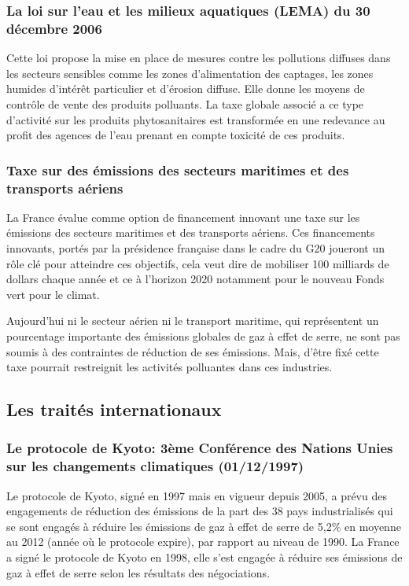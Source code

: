\documentclass[a4paper,11pt]{article}
\begin{document}
\subsubsection[La loi sur l’eau et les milieux aquatiques (LEMA)]{La loi sur l’eau et les milieux aquatiques (LEMA) du 30 décembre 2006}

Cette loi propose la mise en place de mesures contre les pollutions diffuses dans les secteurs sensibles comme les zones d’alimentation des captages, les zones humides d’intérêt particulier et d’érosion diffuse.
Elle donne les moyens de contrôle de vente des produits polluants. La taxe globale associé a ce type d’activité sur les produits phytosanitaires est transformée en une redevance au profit des agences de l’eau prenant en compte toxicité de ces produits.

\subsubsection{Taxe sur des émissions des secteurs maritimes et des transports aériens}

La France évalue comme option de financement innovant une taxe sur les émissions
des secteurs  maritimes et des  transports aériens. Ces  financements innovants,
portés par  la présidence française  dans le cadre  du G20 joueront un  rôle clé
pour  atteindre ces  objectifs, cela  veut dire  de mobiliser  100  milliards de
dollars chaque année et ce à l’horizon 2020 notamment pour le nouveau Fonds vert
pour le climat.


Aujourd'hui ni le  secteur aérien ni le transport  maritime, qui représentent un
pourcentage importante des  émissions globales de gaz à effet  de serre, ne sont
pas soumis  à des contraintes de  réduction de ses émissions.  Mais, d’être fixé
cette taxe pourrait restreignit les activités polluantes dans ces industries.


\subsection{Les traités internationaux}

\subsubsection[Le protocole de Kyoto]{Le protocole de Kyoto: 3ème Conférence des Nations Unies sur les changements climatiques  (01/12/1997)}

Le protocole de  Kyoto, signé en 1997  mais en vigueur depuis 2005,  a prévu des
engagements de réduction des émissions de la part des 38 pays industrialisés qui
se sont  engagés à réduire  les émissions de  gaz à effet  de serre de  5,2\% en
moyenne  au 2012  (année  où le  protocole  expire), par  rapport  au niveau  de
1990. La  France a signé  le protocole  de Kyoto en  1998, elle s’est  engagée à
réduire  ses  émissions  de  gaz  à  effet de  serre  selon  les  résultats  des
négociations.
\end{document}
